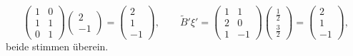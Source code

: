 \begin{beispiel}
\[\begin{pmatrix}
1&0\\
1&1\\
0&1
\end{pmatrix}
\begin{pmatrix}2\\-1\end{pmatrix}
=\begin{pmatrix} 2\\1\\-1 \end{pmatrix}
,\qquad
\tilde B' \xi'
=
\begin{pmatrix}
1& 1\\
2& 0\\
1&-1
\end{pmatrix}\begin{pmatrix}\frac12\\\frac32\end{pmatrix}
=\begin{pmatrix}2\\1\\-1 \end{pmatrix},
\]
beide stimmen überein.
\end{beispiel}

